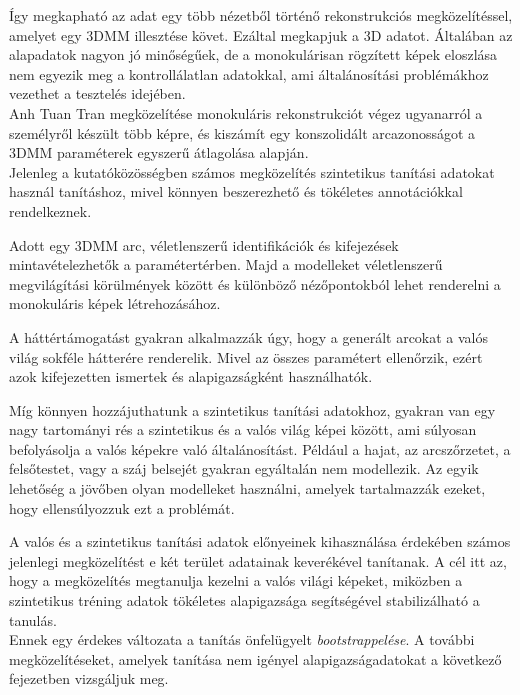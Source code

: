 \documentclass[12pt,a4]{article}
\begin{document}
	Így megkapható az adat egy több nézetből történő rekonstrukciós megközelítéssel, amelyet egy 3DMM illesztése követ. Ezáltal megkapjuk a 3D adatot. Általában az alapadatok nagyon jó minőségűek,
	de a monokulárisan rögzített képek eloszlása nem
	egyezik meg a kontrollálatlan adatokkal, ami általánosítási problémákhoz vezethet
	a tesztelés idejében.\\
	
	\cite{tran}Anh Tuan Tran megközelítése monokuláris rekonstrukciót végez ugyanarról a személyről készült több képre, és kiszámít egy konszolidált arcazonosságot a 3DMM paraméterek egyszerű átlagolása alapján. \\
	
	Jelenleg a kutatóközösségben számos megközelítés szintetikus tanítási adatokat használ tanításhoz, mivel könnyen beszerezhető és tökéletes annotációkkal rendelkeznek. 
	
	Adott egy 3DMM arc, véletlenszerű identifikációk és kifejezések mintavételezhetők a paramétertérben. 
	Majd a modelleket véletlenszerű megvilágítási körülmények között és különböző nézőpontokból lehet renderelni a monokuláris képek létrehozásához. 
	
	A háttértámogatást gyakran alkalmazzák úgy, hogy a generált arcokat a valós világ sokféle hátterére renderelik. Mivel az összes paramétert ellenőrzik, ezért azok kifejezetten ismertek és alapigazságként használhatók.
	
	Míg könnyen hozzájuthatunk a szintetikus tanítási adatokhoz, gyakran van egy nagy tartományi rés
	a szintetikus és a valós világ képei között, ami súlyosan befolyásolja
	a valós képekre való általánosítást. Például a hajat, az arcszőrzetet, a felsőtestet,
	vagy a száj belsejét gyakran egyáltalán nem modellezik. Az egyik lehetőség
	a jövőben olyan modelleket használni, amelyek tartalmazzák ezeket, hogy ellensúlyozzuk ezt a problémát. 
	
	A valós és a szintetikus tanítási adatok előnyeinek kihasználása érdekében számos jelenlegi megközelítést e két terület adatainak keverékével tanítanak. A cél itt az, hogy a megközelítés megtanulja kezelni a valós világi képeket, miközben a szintetikus tréning adatok tökéletes alapigazsága
	segítségével stabilizálható a tanulás.\\

	Ennek egy érdekes változata
	a tanítás önfelügyelt \textit{bootstrappelése}. A további megközelítéseket, amelyek tanítása nem igényel
	alapigazságadatokat a következő fejezetben vizsgáljuk meg.
	
\end{document}

